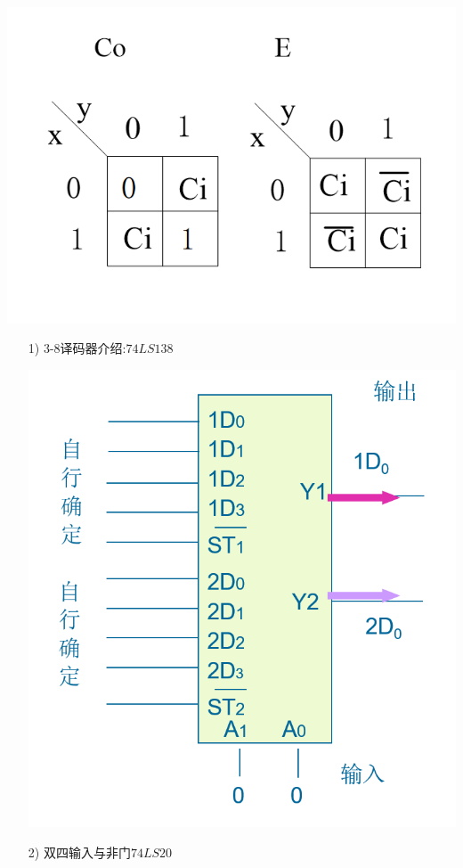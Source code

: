\documentclass[UTF8]{ctexart}
\begin{document}
\begin{enumerate}
\begin{itemize}
\begin{itemize}
\begin{center}
                            \includegraphics[scale=0.4]{12.png}
                        \end{center}
                              \begin{itemize}
                                  \item [1)]  3-8译码器介绍:$74LS138$
                                  \begin{center}
                                      \includegraphics[scale=0.4]{10.png}
                                  \end{center}
                                  \item [2)]  双四输入与非门$74LS20$


\end{itemize}
\end{itemize}
\end{itemize}
\end{enumerate}
\end{document}
